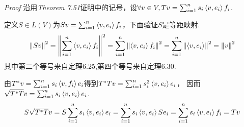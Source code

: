\textit{Proof}
沿用\textit{Theorem 7.51}证明中的记号，设\(\forall v \in V,Tv=\sum_{i=1}^n s_i\left\langle v,e_i \right\rangle f_i\).

定义\(S \in L(V)\)为\(Sv=\sum_{i=1}^n \left\langle v,e_i \right\rangle f_i\)，下面验证\(S\)是等距映射.
    \begin{align*}
        \left\lVert Sv \right\rVert^2=\left\lVert \sum_{i=1}^n \left\langle v,e_i \right\rangle f_i \right\rVert^2=\sum_{i=1}^n \left\lVert \left\langle v,e_i \right\rangle f_i \right\rVert^2
        =\sum_{i=1}^n \left\lVert \left\langle v,e_i \right\rangle \right\rVert^2=\left\lVert v \right\rVert^2
    \end{align*}
其中第二个等号来自定理6.25,第四个等号来自定理6.30.

由\(T^*v=\sum_{i=1}^n s_i\left\langle v,f_i \right\rangle e_i\)得到\(T^*Tv=\sum_{i=1}^n s_i^2 \left\langle v,e_i \right\rangle e_i\)，
因而\(\sqrt{T^*T}v=\sum_{i=1}^n s_i\left\langle v,e_i \right\rangle e_i\).
    \begin{align*}
        S\sqrt{T^*T}v=S\sum_{i=1}^n s_i\left\langle v,e_i \right\rangle e_i=\sum_{i=1}^n s_i\left\langle v,e_i \right\rangle Se_i
        =\sum_{i=1}^n s_i\left\langle v,e_i \right\rangle f_i=Tv
    \end{align*}

